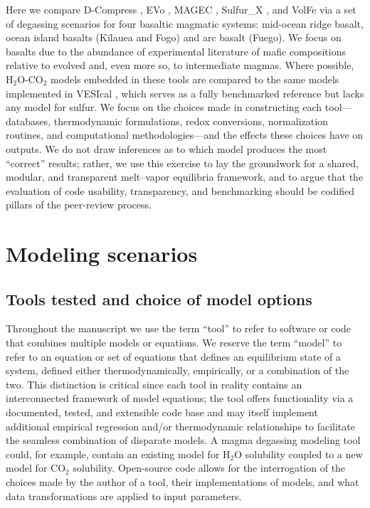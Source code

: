 \documentclass[draft, english]{volcanica-template}
\begin{document}
Here we compare D-Compress \parencite{Burgisser2015}, EVo \parencite{Liggins2020, Liggins2022}, MAGEC \parencite{Sun2022, Sun2024}, Sulfur\_X \parencite{Ding2023}, and VolFe \parencite{hughes2024,Hughes2025volfe} via a set of degassing scenarios for four basaltic magmatic systems: mid-ocean ridge basalt, ocean island basalts (Kīlauea and Fogo) and arc basalt (Fuego). We focus on basalts due to the abundance of experimental literature of mafic compositions relative to evolved and, even more so, to intermediate magmas. Where possible, H$_2$O-CO$_2$ models embedded in these tools are compared to the same models implemented in VESIcal \parencite{Iacovino2021}, which serves as a fully benchmarked reference but lacks any model for sulfur. We focus on the choices made in constructing each tool—databases, thermodynamic formulations, redox conversions, normalization routines, and computational methodologies—and the effects these choices have on outputs. We do not draw inferences as to which model produces the most ``correct'' results; rather, we use this exercise to lay the groundwork for a shared, modular, and transparent melt–vapor equilibria framework, and to argue that the evaluation of code usability, transparency, and benchmarking should be codified pillars of the peer-review process.

\section{Modeling scenarios}
\subsection{Tools tested and choice of model options}
\label{sec:modelcomparisons}
Throughout the manuscript we use the term ``tool'' to refer to software or code that combines multiple models or equations. We reserve the term ``model'' to refer to an equation or set of equations that defines an equilibrium state of a system, defined either thermodynamically, empirically, or a combination of the two. This distinction is critical since each tool in reality contains an interconnected framework of model equations; the tool offers functionality via a documented, tested, and extensible code base and may itself implement additional empirical regression and/or thermodynamic relationships to facilitate the seamless combination of disparate models. A magma degassing modeling tool could, for example, contain an existing model for H$_2$O solubility coupled to a new model for CO$_2$ solubility. Open-source code allows for the interrogation of the choices made by the author of a tool, their implementations of models, and what data transformations are applied to input parameters. 
\end{document}

